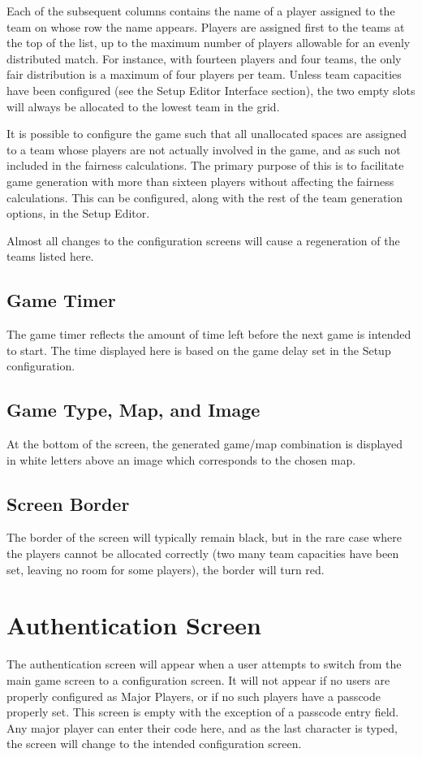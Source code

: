\documentclass[10pt,a4paper]{report}
\begin{document}
Each of the subsequent columns contains the name of a player assigned to the team on whose row the name appears.  Players are assigned first to the teams at the top of the list, up to the maximum number of players allowable for an evenly distributed match.  For instance, with fourteen players and four teams, the only fair distribution is a maximum of four players per team.  Unless team capacities have been configured (see the Setup Editor Interface section), the two empty slots will always be allocated to the lowest team in the grid.

It is possible to configure the game such that all unallocated spaces are assigned to a team whose players are not actually involved in the game, and as such not included in the fairness calculations.  The primary purpose of this is to facilitate game generation with more than sixteen players without affecting the fairness calculations.  This can be configured, along with the rest of the team generation options, in the Setup Editor.

Almost all changes to the configuration screens will cause a regeneration of the teams listed here.

\subsection{Game Timer}
The game timer reflects the amount of time left before the next game is intended to start.  The time displayed here is based on the game delay set in the Setup configuration.

\subsection{Game Type, Map, and Image}
At the bottom of the screen, the generated game/map combination is displayed in white letters above an image which corresponds to the chosen map.

\subsection{Screen Border}
The border of the screen will typically remain black, but in the rare case where the players cannot be allocated correctly (two many team capacities have been set, leaving no room for some players), the border will turn red.

\section{Authentication Screen}
The authentication screen will appear when a user attempts to switch from the main game screen to a configuration screen.  It will not appear if no users are properly configured as Major Players, or if no such players have a passcode properly set.  This screen is empty with the exception of a passcode entry field.  Any major player can enter their code here, and as the last character is typed, the screen will change to the intended configuration screen.
\end{document}
